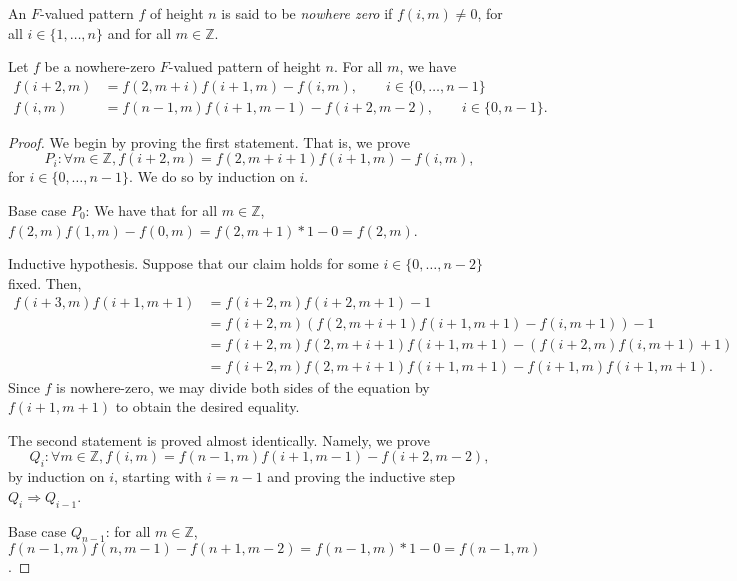 An $F$-valued pattern $f$ of height $n$ is said to be {\it nowhere zero} if $f(i,m) \neq 0$, for all $i \in \{1,\ldots , n\}$ and for all $m \in \mathbb{Z}$.
\begin{lemma}
    \label{l:pattern_nContinuant}
    Let $f$ be a nowhere-zero $F$-valued pattern of height $n$. For all $m$, we have 
    \begin{align*}
        f(i+2,m) &= f(2,m+i) f(i+1,m) - f(i,m), \qquad i \in \{0, \ldots, n-1\} \\
        f (i,m) &= f (n-1,m) f (i+1,m-1) - f(i+2,m-2), \qquad i \in \{0,n-1\}. 
    \end{align*}
\end{lemma}
\begin{proof}
    We begin by proving the first statement. That is, we prove
    \[
        P_i : \forall m \in \mathbb{Z},  f(i+2,m) = f(2,m+i+1) f(i+1,m) - f(i,m),
    \] 
    for $ i \in \{0, \ldots, n-1\}$. We do so by induction on $i$. 

    Base case $P_0$: We have that for all $m \in \mathbb{Z}$, $f(2,m) f(1,m) - f(0,m) = f (2,m+1)*1 - 0 = f (2,m)$. 

    Inductive hypothesis. Suppose that our claim holds for some  $i \in \{0,\ldots, n-2\}$ fixed. Then, 
    \begin{align*}
        f (i+3,m) f (i+1,m+1) & = f (i+2,m) f (i+2,m+1)-1 \\
                            &= f (i+2,m) (f(2,m+i+1) f(i+1,m+1) - f(i,m+1)) -1 \\
                            &= f (i+2,m) f (2,m+i+1) f (i+1,m+1) - (f (i+2,m)f (i,m+1) + 1) \\
                            &= f (i+2,m) f (2,m+i+1) f (i+1,m+1) - f(i+1,m) f (i+1,m+1).
    \end{align*}
    Since $f$ is nowhere-zero, we may divide both sides of the equation by $f (i+1,m+1)$ to obtain the desired equality.

    The second statement is proved almost identically. Namely, we prove
    \[
        Q_i: \forall m \in \mathbb{Z}, f (i,m) = f (n-1,m) f (i+1,m-1) - f(i+2,m-2),
    \]
    by induction on $i$, starting with $i = n-1$ and proving the inductive step $Q_i \Rightarrow Q_{i-1}$. 

    Base case $Q_{n-1}$: for all $m \in \mathbb{Z}$, $ f (n-1,m) f (n,m-1) - f(n+1,m-2) = f (n-1,m)*1 - 0 = f (n-1,m)$. 


\end{proof}
